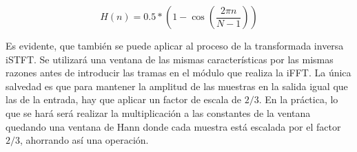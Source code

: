 \begin{equation}
\label{eq:Hann}
 H(n) = 0.5 * \left(1 - \cos\left(\frac{2\pi n}{N - 1}\right)\right)
 \end{equation} 
 
Es evidente, que también se puede aplicar al proceso de la transformada inversa iSTFT. Se utilizará una ventana de las mismas características por las mismas razones antes de introducir las tramas en el módulo que realiza la iFFT. La única salvedad es que para mantener la amplitud de las muestras en la salida igual que las de la entrada, hay que aplicar un factor de escala de $2/3$. En la práctica, lo que se hará será realizar la multiplicación a las constantes de la ventana quedando una ventana de Hann donde cada muestra está escalada por el factor $2/3$, ahorrando así una operación.



 
 




